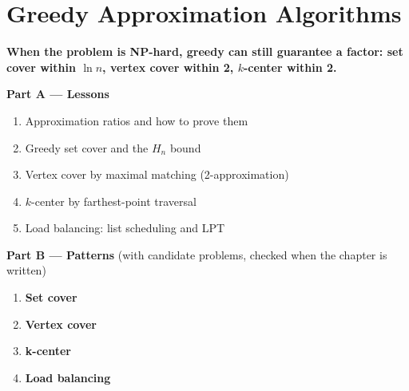 \chapter{Greedy Approximation Algorithms}
\label{ch:approximation}

\begin{tcolorbox}[enhanced, colback=white, colframe=secondaryblue, boxrule=1pt, arc=2mm]
\textbf{\large\textcolor{primaryblue}{When the problem is NP-hard, greedy can still guarantee a factor: set cover within $\ln n$, vertex cover within 2, $k$-center within 2.}}
\end{tcolorbox}


\begin{plannedbox}
\textbf{Part A --- Lessons}
\begin{enumerate}[leftmargin=*, label=\textbf{A\arabic*.}, itemsep=1pt]
    \item Approximation ratios and how to prove them
    \item Greedy set cover and the $H_n$ bound
    \item Vertex cover by maximal matching (2-approximation)
    \item $k$-center by farthest-point traversal
    \item Load balancing: list scheduling and LPT
\end{enumerate}
\textbf{Part B --- Patterns} (with candidate problems, checked when the chapter is written)
\begin{enumerate}[leftmargin=*, label=\textbf{P\arabic*.}, itemsep=1pt]
    \item \textbf{Set cover}
    \item \textbf{Vertex cover}
    \item \textbf{k-center}
    \item \textbf{Load balancing}
\end{enumerate}
\end{plannedbox}
